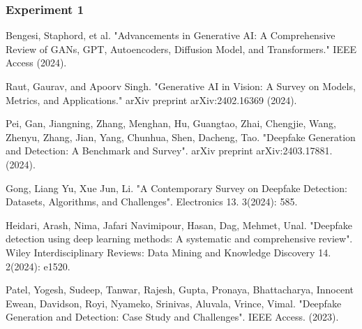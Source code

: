 \documentclass{svproc}
\begin{document}
\subsubsection{Experiment 1}



%
%
\begin{thebibliography}{6}

  Bengesi, Staphord, et al. "Advancements in Generative AI: A Comprehensive
  Review of GANs, GPT, Autoencoders, Diffusion Model, and Transformers." IEEE
  Access (2024).

  Raut, Gaurav, and Apoorv Singh. "Generative AI in Vision: A Survey on Models,
  Metrics, and Applications." arXiv preprint arXiv:2402.16369 (2024).

  Pei, Gan, Jiangning, Zhang, Menghan, Hu, Guangtao, Zhai, Chengjie, Wang,
  Zhenyu, Zhang, Jian, Yang, Chunhua, Shen, Dacheng, Tao. "Deepfake Generation
  and Detection: A Benchmark and Survey". arXiv preprint arXiv:2403.17881.
  (2024).

  Gong, Liang Yu, Xue Jun, Li. "A Contemporary Survey on Deepfake Detection:
  Datasets, Algorithms, and Challenges". Electronics 13. 3(2024): 585.

  Heidari, Arash, Nima, Jafari Navimipour, Hasan, Dag, Mehmet, Unal. "Deepfake
  detection using deep learning methods: A systematic and comprehensive
  review".
  Wiley Interdisciplinary Reviews: Data Mining and Knowledge Discovery 14.
  2(2024): e1520.

  Patel, Yogesh, Sudeep, Tanwar, Rajesh, Gupta, Pronaya, Bhattacharya, Innocent
  Ewean, Davidson, Royi, Nyameko, Srinivas, Aluvala, Vrince, Vimal. "Deepfake
  Generation and Detection: Case Study and Challenges". IEEE Access. (2023).





\end{thebibliography}
\end{document}

